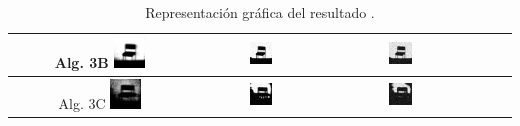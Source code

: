 \documentclass[main]{subfiles}
\begin{document}
\begin{table}
\centering
\begin{tabular}{cccccc}\hline
Alg. 3B\quad
\includegraphics[width=0.18\textwidth]{img/res/e3a/alg3btipo-chairga.jpg} &
\includegraphics[width=0.18\textwidth]{img/res/e3a/alg3btipo-chairsp005.jpg} &
\includegraphics[width=0.18\textwidth]{img/res/e3a/alg3btipo-chairsp020.jpg}\\\hline
Alg. 3C\quad
\includegraphics[width=0.18\textwidth]{img/res/e3a/alg3ctipo-chairga.jpg} &
\includegraphics[width=0.18\textwidth]{img/res/e3a/alg3ctipo-chairsp005.jpg} &
\includegraphics[width=0.18\textwidth]{img/res/e3a/alg3ctipo-chairsp020.jpg}\\\hline
\end{tabular}
\caption{Representación gráfica del resultado .\label{tab:resultexp3imagenesruido}}
\end{table}
\end{document}
